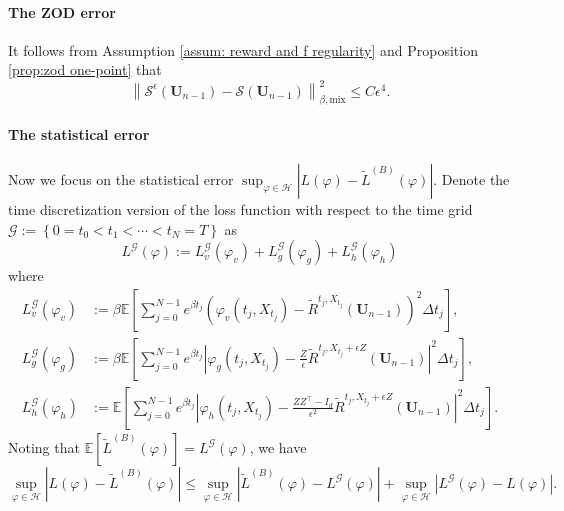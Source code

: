 \documentclass[twoside,11pt]{article}
\newcommand{\E}{\mathbb{E}}
\newcommand{\cH}{\mathcal{H}}
\newcommand{\1}{\mathbf{1}}
\numberwithin{equation}{section}
\newcommand{\normmix}[1]{\left\|#1\right\|_{\beta, \text{mix}}}
\begin{document}
\paragraph{The ZOD error}
It follows from  Assumption \ref{assum: reward and f regularity} and Proposition \ref{prop:zod one-point} that
\begin{equation}
    \normmix{\mathcal{S}^\epsilon(\mathbf{U}_{n-1}) - \mathcal{S}(\mathbf{U}_{n-1})}^2 \le C \epsilon^4.
\end{equation}
\paragraph{The statistical error}
Now we focus on the statistical error $\sup_{\varphi \in \cH} |L(\varphi) - \tilde L^{(B)}(\varphi)|$.
Denote the time discretization version of the loss function with respect to the time grid $ \mathscr{G}:=\left\{ 0 = t_0<t_1<\cdots< t_N = T\right\}$ as
\begin{equation}
    L^{\mathscr{G}}(\varphi) := L^{\mathscr{G}}_v(\varphi_v) + L^{\mathscr{G}}_g(\varphi_g) + L^{\mathscr{G}}_h(\varphi_h)
\end{equation}
where
\begin{equation}
    \begin{aligned}
        L_v^{\mathscr{G}}(\varphi_v) &:= \beta\E\left[\sum_{j=0}^{N-1} e^{\beta t_j}\left( \varphi_v(t_j,X_{t_j}) - \tilde R^{t_j,X_{t_j}}(\mathbf{U}_{n-1}) \right)^2 \Delta t_j\right], \\
    L_{g}^{\mathscr{G}}(\varphi_g) &:= \beta\E\left[\sum_{j = 0}^{N-1} e^{\beta t_j}\left| \varphi_g(t_j,X_{t_j}) - \frac{Z}{\epsilon} \tilde R^{t_j, X_{t_j}+\epsilon Z}(\mathbf{U}_{n-1}) \right|^2 \Delta t_j\right], \\
    L_{h}^{\mathscr{G}}(\varphi_{h}) &:= \E\left[\sum_{j = 0}^{N-1} e^{\beta t_j}\left| \varphi_h(t_j,X_{t_j}) - \frac{ZZ^{\top} - I_d}{\epsilon^2} \tilde R^{t_j, X_{t_j}+\epsilon Z}(\mathbf{U}_{n-1}) \right|^2 \Delta t_j\right].
    \end{aligned}
\end{equation}
Noting  that $ \E[\tilde L^{(B)}(\varphi)] = L^{\mathscr{G}}(\varphi)$, we have
\begin{equation}\label{eq: population loss and empirical loss decomp}
    \sup_{\varphi \in \cH} \left| L(\varphi) - \tilde L^{(B)}(\varphi)\right| \le \sup_{\varphi \in \cH} \left|  \tilde L^{(B)}(\varphi) - L^{\mathscr{G}}(\varphi)\right| + \sup_{\varphi \in \cH} \left|  L^{\mathscr{G}}(\varphi) - L(\varphi)\right|.
\end{equation}
\end{document}
